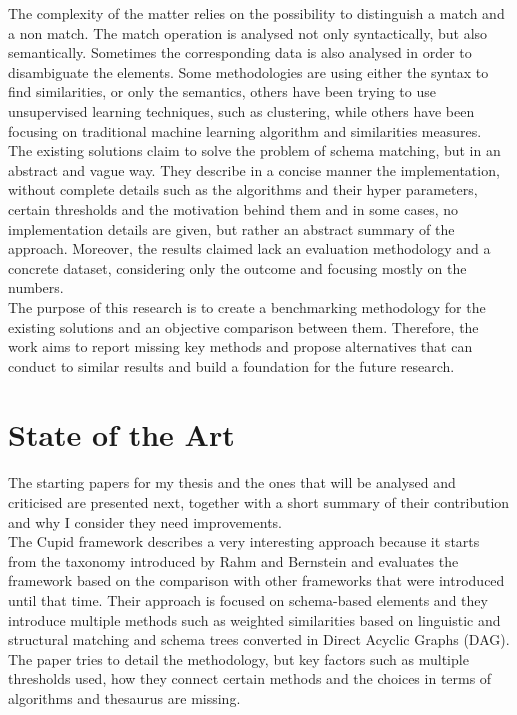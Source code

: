 \documentclass[a4paper]{article}
\begin{document}
The complexity of the matter relies on the possibility to distinguish a match and a non match. The match operation is analysed not only syntactically, but also semantically. Sometimes the corresponding data is also analysed in order to disambiguate the elements. Some methodologies are using either the syntax to find similarities, or only the semantics, others have been trying to use unsupervised learning techniques, such as clustering, while others have been focusing on traditional machine learning algorithm and similarities measures. \\

The existing solutions claim to solve the problem of schema matching, but in an abstract and vague way. They describe in a concise manner the implementation, without complete details such as the algorithms and their hyper parameters, certain thresholds and the motivation behind them and in some cases, no implementation details are given, but rather an abstract summary of the approach. Moreover, the results claimed lack an evaluation methodology and a concrete dataset, considering only the outcome and focusing mostly on the numbers. \\

The purpose of this research is to create a benchmarking methodology for the existing solutions and an objective comparison between them. Therefore, the work aims to report missing key methods and propose alternatives that can conduct to similar results and build a foundation for the future research.  



\section{State of the Art}
The starting papers for my thesis and the ones that will be analysed and criticised are presented next, together with a short summary of their contribution and why I consider they need improvements. \\

The Cupid framework \cite{madhavan2001generic} describes a very interesting approach because it starts from the taxonomy introduced by Rahm and Bernstein \cite{rahm2001matching} and evaluates the framework based on the comparison with other frameworks that were introduced until that time. Their approach is focused on schema-based elements and they introduce multiple methods such as weighted similarities based on linguistic and structural matching and schema trees converted in Direct Acyclic Graphs (DAG). The paper tries to detail the methodology, but key factors such as multiple thresholds used, how they connect certain methods and the choices in terms of algorithms and thesaurus are missing. \\
\end{document}
